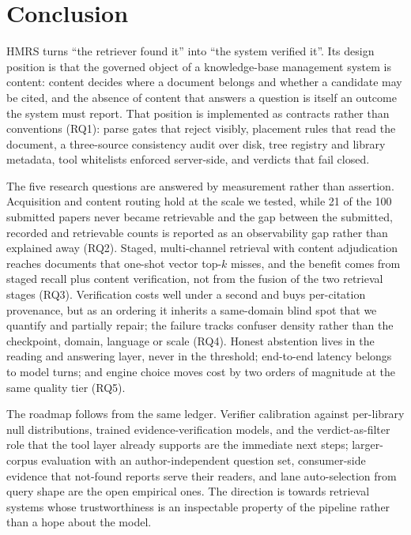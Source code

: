 \section{Conclusion}
\label{sec:conclusion}

HMRS turns ``the retriever found it'' into ``the system verified it''. Its
design position is that the governed object of a knowledge-base management
system is content: content decides where a document belongs and whether a
candidate may be cited, and the absence of content that answers a question is
itself an outcome the system must report. That position is implemented as
contracts rather than conventions (RQ1): parse gates that reject visibly,
placement rules that read the document, a three-source consistency audit over
disk, tree registry and library metadata, tool whitelists enforced server-side,
and verdicts that fail closed.

The five research questions are answered by measurement rather than
assertion. Acquisition and content routing hold at the scale we tested, while
21 of the 100 submitted papers never became retrievable and the gap between the
submitted, recorded and retrievable counts is reported as an observability gap
rather than explained away (RQ2). Staged, multi-channel retrieval with content
adjudication reaches documents that one-shot vector top-$k$ misses, and the
benefit comes from staged recall plus content verification, not from the fusion
of the two retrieval stages (RQ3). Verification costs well under a second and
buys per-citation provenance, but as an ordering it inherits a same-domain
blind spot that we quantify and partially repair; the failure tracks confuser
density rather than the checkpoint, domain, language or scale (RQ4). Honest
abstention lives in the reading and answering layer, never in the threshold;
end-to-end latency belongs to model turns; and engine choice moves cost by two
orders of magnitude at the same quality tier (RQ5).

The roadmap follows from the same ledger. Verifier calibration against
per-library null distributions, trained evidence-verification models, and the
verdict-as-filter role that the tool layer already supports are the immediate
next steps; larger-corpus evaluation with an author-independent question set,
consumer-side evidence that not-found reports serve their readers, and lane
auto-selection from query shape are the open empirical ones. The direction is
towards retrieval systems whose trustworthiness is an inspectable property of
the pipeline rather than a hope about the model.
